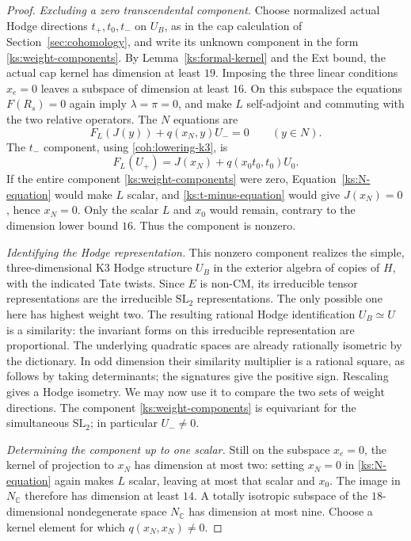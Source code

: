 \documentclass[11pt]{article}
\numberwithin{equation}{section}
\theoremstyle{definition}
\theoremstyle{remark}
\begin{document}
\begin{proof}
\emph{Excluding a zero transcendental component.}
Choose normalized actual Hodge directions $t_+,t_0,t_-$
on $U_B$, as in the cap calculation of
Section~\ref{sec:cohomology}, and write its unknown component
in the form \eqref{ks:weight-components}.
By Lemma~\ref{ks:formal-kernel} and the Ext bound, the actual
cap kernel has dimension at least $19$.  Imposing the three
linear conditions $x_e=0$ leaves a subspace of dimension at
least $16$.  On this subspace the
equations $F(R_s)=0$ again imply $\lambda=\pi=0$, and
make $L$ self-adjoint and commuting with the two relative
operators.  The $N$ equations are
\begin{equation}
 \label{ks:N-equation}
 F_L(J(y))+q(x_N,y)U_-=0\qquad(y\in N).
\end{equation}
The $t_-$ component, using \eqref{coh:lowering-k3}, is
\begin{equation}
 \label{ks:t-minus-equation}
 F_L(U_+)=J(x_N)+q(x_0t_0,t_0)U_0.
\end{equation}
If the entire component \eqref{ks:weight-components} were
zero, Equation~\eqref{ks:N-equation} would make $L$ scalar,
and \eqref{ks:t-minus-equation} would give $J(x_N)=0$,
hence $x_N=0$.
Only the scalar $L$ and $x_0$ would remain, contrary to
the dimension lower bound $16$.  Thus the component is
nonzero.

\emph{Identifying the Hodge representation.}
This nonzero component realizes the simple, three-dimensional
K3 Hodge structure $U_B$ in the exterior algebra of copies of
$H$, with the indicated Tate twists.  Since $E$ is non-CM,
its irreducible tensor representations are the irreducible
$\mathrm{SL}_2$ representations.  The only possible one here
has highest weight two.  The resulting rational Hodge
identification $U_B\simeq U$ is a similarity: the invariant
forms on this irreducible representation are proportional.
The underlying quadratic spaces are already rationally
isometric by the dictionary.  In odd dimension their similarity
multiplier is a rational square, as follows by taking
determinants; the signatures give the positive sign.  Rescaling
gives a Hodge isometry.  We may now use it to compare the two
sets of weight directions.  The component
\eqref{ks:weight-components} is equivariant for the simultaneous
$\mathrm{SL}_2$; in particular $U_-\ne0$.

\emph{Determining the component up to one scalar.}
Still on the subspace $x_e=0$, the kernel of projection
to $x_N$ has dimension at most two: setting $x_N=0$
in \eqref{ks:N-equation} again makes $L$ scalar, leaving
at most that scalar and $x_0$.  The image in $N_{\mathbb C}$
therefore has dimension at least $14$.  A totally isotropic
subspace of the $18$-dimensional nondegenerate space
$N_{\mathbb C}$ has dimension at most nine.  Choose a kernel
element for which $q(x_N,x_N)\ne0$.


\end{proof}
\end{document}

